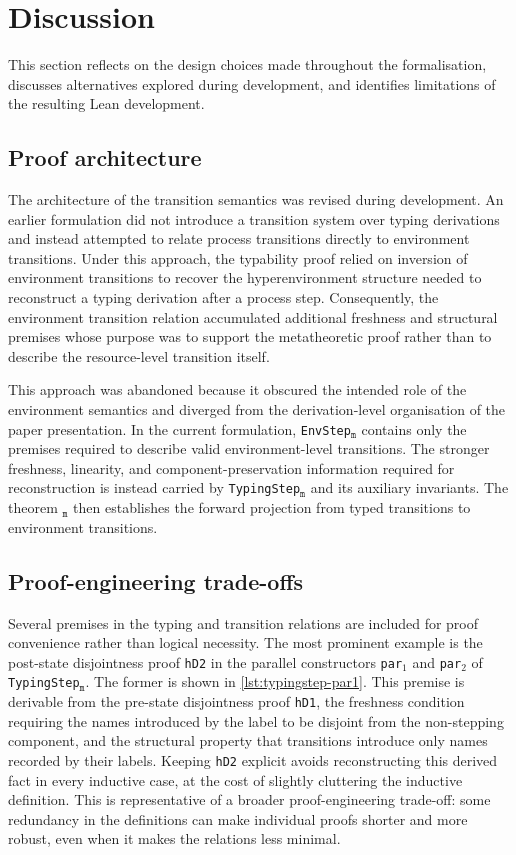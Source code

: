\section{Discussion}\label{sec:discussion}
This section reflects on the design choices made throughout the formalisation, discusses alternatives explored during development, and identifies limitations of the resulting Lean development.

\subsection{Proof architecture}
The architecture of the transition semantics was revised during development. An earlier formulation did not introduce a transition system over typing derivations and instead attempted to relate process transitions directly to environment transitions. Under this approach, the typability proof relied on inversion of environment transitions to recover the hyperenvironment structure needed to reconstruct a typing derivation after a process step. Consequently, the environment transition relation accumulated additional freshness and structural premises whose purpose was to support the metatheoretic proof rather than to describe the resource-level transition itself.

This approach was abandoned because it obscured the intended role of the environment semantics and diverged from the derivation-level organisation of the paper presentation. In the current formulation, \texttt{EnvStep}$_{\texttt{m}}$ contains only the premises required to describe valid environment-level transitions. The stronger freshness, linearity, and component-preservation information required for reconstruction is instead carried by \texttt{TypingStep}$_{\texttt{m}}$ and its auxiliary invariants. The theorem $_{\texttt{m}}$ then establishes the forward projection from typed transitions to environment transitions.

\subsection{Proof-engineering trade-offs}
Several premises in the typing and transition relations are included for proof convenience rather than logical necessity. The most prominent example is the post-state disjointness proof \texttt{hD2} in the parallel constructors \texttt{par}$_1$ and \texttt{par}$_2$ of \texttt{TypingStep}$_{\texttt{m}}$. The former is shown in \cref{lst:typingstep-par1}. This premise is derivable from the pre-state disjointness proof \texttt{hD1}, the freshness condition requiring the names introduced by the label to be disjoint from the non-stepping component, and the structural property that transitions introduce only names recorded by their labels. Keeping \texttt{hD2} explicit avoids reconstructing this derived fact in every inductive case, at the cost of slightly cluttering the inductive definition. This is representative of a broader proof-engineering trade-off: some redundancy in the definitions can make individual proofs shorter and more robust, even when it makes the relations less minimal.

